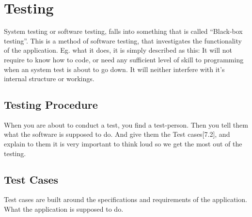 \section{Testing}
System testing or software testing, falls into something that is called “Black-box testing”. This is a method of software testing, that investigates the functionality of the application. Eg. what it does, it is simply described as this:
It will not require to know how to code, or need any sufficient level of skill to programming when an system test is about to go down. It will neither interfere with it’s internal structure or workings. 

\subsection{Testing Procedure}

When you are about to conduct a test, you find a test-person. Then you tell them what the software is supposed to do. And give them the Test cases[7.2], and explain to them it is very important to think loud so we get the most out of the testing. 

\subsection{Test Cases}

Test cases are built around the specifications and requirements of the application. What the application is supposed to do.  

